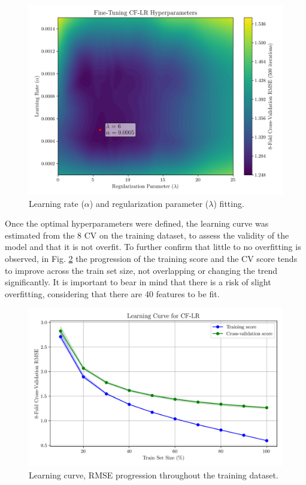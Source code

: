 \documentclass[conference]{IEEEtran}
\begin{document}
\begin{figure}[H]
    \centering
    \includegraphics[width=1\linewidth]{assets/model01_hyperparametres.png}
    \caption{Learning rate ($\alpha$) and regularization parameter ($\lambda$) fitting.}
    \label{fig:model01_hyperparametres}
\end{figure}

Once the optimal hyperparameters were defined, the learning curve was estimated from the 8 CV on the training dataset, to assess the validity of the model and that it is not overfit. To further confirm that little to no overfitting is observed, in Fig. \ref{fig:model01_learning_curve} the progression of the training score and the CV score tends to improve across the train set size, not overlapping or changing the trend significantly. It is important to bear in mind that there is a risk of slight overfitting, considering that there are 40 features to be fit.

\begin{figure}[H]
    \centering
    \includegraphics[width=1\linewidth]{assets/model01_learning_curve.png}
    \caption{Learning curve, RMSE progression throughout the training dataset.}
    \label{fig:model01_learning_curve}
\end{figure}
\end{document}
